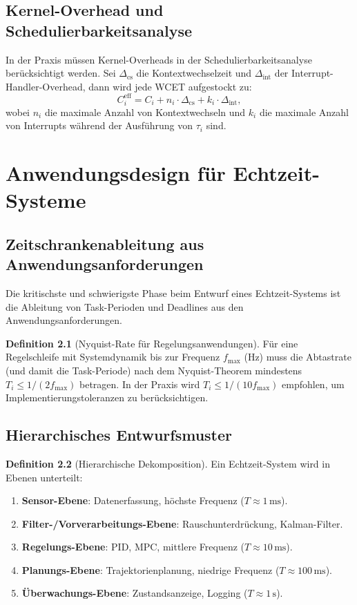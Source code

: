 ﻿\documentclass[a4paper,12pt]{report}
\theoremstyle{definition}
\newtheorem{definition}{Definition}[chapter]
\begin{document}
\section{Kernel-Overhead und Schedulierbarkeitsanalyse}

In der Praxis müssen Kernel-Overheads in der Schedulierbarkeitsanalyse berücksichtigt
werden. Sei $\Delta_{\text{cs}}$ die Kontextwechselzeit und $\Delta_{\text{int}}$ der
Interrupt-Handler-Overhead, dann wird jede WCET aufgestockt zu:
\[
	C_i^{\text{eff}} = C_i + n_i \cdot \Delta_{\text{cs}} + k_i \cdot \Delta_{\text{int}},
\]
wobei $n_i$ die maximale Anzahl von Kontextwechseln und $k_i$ die maximale
Anzahl von Interrupts während der Ausführung von $\tau_i$ sind.

\chapter{Anwendungsdesign für Echtzeit-Systeme}
\label{chap:anwendung}

\section{Zeitschrankenableitung aus Anwendungsanforderungen}

Die kritischste und schwierigste Phase beim Entwurf eines Echtzeit-Systems
ist die Ableitung von Task-Perioden und Deadlines aus den Anwendungsanforderungen.

\begin{definition}[Nyquist-Rate für Regelungsanwendungen]
	Für eine Regelschleife mit Systemdynamik bis zur Frequenz $f_{\max}$ (Hz) muss
	die Abtastrate (und damit die Task-Periode) nach dem Nyquist-Theorem mindestens
	$T_i \leq 1/(2 f_{\max})$ betragen. In der Praxis wird $T_i \leq 1/(10 f_{\max})$
	empfohlen, um Implementierungstoleranzen zu berücksichtigen.
\end{definition}

\section{Hierarchisches Entwurfsmuster}

\begin{definition}[Hierarchische Dekomposition]
	Ein Echtzeit-System wird in Ebenen unterteilt:
	\begin{enumerate}
		\item \textbf{Sensor-Ebene}: Datenerfassung, höchste Frequenz ($T \approx 1\,\text{ms}$).
		\item \textbf{Filter-/Vorverarbeitungs-Ebene}: Rauschunterdrückung, Kalman-Filter.
		\item \textbf{Regelungs-Ebene}: PID, MPC, mittlere Frequenz ($T \approx 10\,\text{ms}$).
		\item \textbf{Planungs-Ebene}: Trajektorienplanung, niedrige Frequenz ($T \approx 100\,\text{ms}$).
		\item \textbf{Überwachungs-Ebene}: Zustandsanzeige, Logging ($T \approx 1\,\text{s}$).
	\end{enumerate}
\end{definition}
\end{document}
